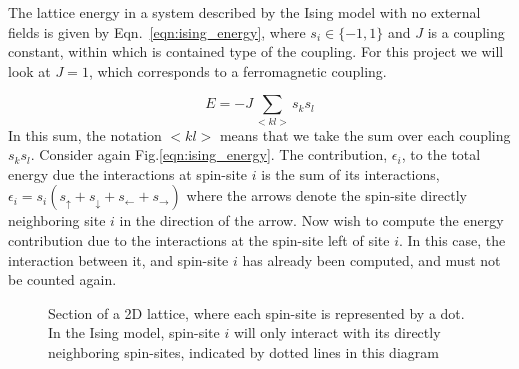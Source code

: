 \documentclass[10pt,showpacs,preprintnumbers,amsmath,amssymb,nofootinbib,aps,prl,twocolumn,groupedaddress,superscriptaddress,showkeys]{revtex4-1}
\begin{document}
    The lattice energy in a system described by the Ising model with no external fields is given by Eqn.~\ref{eqn:ising_energy}, where $s_i \in \{-1, 1\}$ and $J$ is a coupling constant, within which is contained type of the coupling. For this project we will look at $J=1$, which corresponds to a ferromagnetic coupling.

    \begin{equation}
      E = -J\sum_{<kl>} s_ks_l
      \label{eqn:ising_energy}
    \end{equation}
    In this sum, the notation $<kl>$ means that we take the sum over each coupling $s_k s_l$.
    Consider again Fig.\ref{eqn:ising_energy}. The contribution, $\epsilon_i$, to the total energy due the interactions at spin-site $i$ is the sum of its interactions, $\epsilon_i = s_i(s_\uparrow + s_\downarrow + s_\leftarrow + s_\rightarrow)$ where the arrows denote the spin-site directly neighboring site $i$ in the direction of the arrow. Now wish to compute the energy contribution due to the interactions at the spin-site left of site $i$. In this case, the interaction between it, and spin-site $i$ has already been computed, and must not be counted again.

    \begin{figure}[H]
      \centering
      \caption{Section of a 2D lattice, where each spin-site is represented by a dot. In the Ising model, spin-site $i$ will only interact with its directly neighboring spin-sites, indicated by dotted lines in this diagram\label{fig:spinsites}}
    \end{figure}
\end{document}

